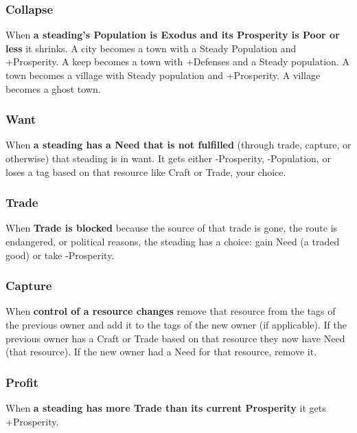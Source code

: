        
\subsubsection{Collapse}   
       

When {\bf a steading's Population is Exodus and its Prosperity is Poor or less}  it shrinks. A city becomes a town with a Steady Population and +Prosperity. A keep becomes a town with +Defenses and a Steady population. A town becomes a village with Steady population and +Prosperity. A village becomes a ghost town.

       
\subsubsection{Want}  
       

When {\bf a steading has a Need that is not fulfilled}  (through trade, capture, or otherwise) that steading is in want. It gets either -Prosperity, -Population, or loses a tag based on that resource like Craft or Trade, your choice.

       
\subsubsection{Trade}   
       

When {\bf Trade is blocked}  because the source of that trade is gone, the route is endangered, or political reasons, the steading has a choice: gain Need (a traded good) or take -Prosperity.

       
\subsubsection{Capture}   
       

When {\bf control of a resource changes}  remove that resource from the tags of the previous owner and add it to the tags of the new owner (if applicable). If the previous owner has a Craft or Trade based on that resource they now have Need (that resource). If the new owner had a Need for that resource, remove it.

       
\subsubsection{Profit}   
       

When {\bf a steading has more Trade than its current Prosperity}  it gets +Prosperity.

